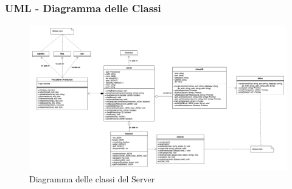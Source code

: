 \begin{landscape}
\subsubsection{UML - Diagramma delle Classi}
\begin{figure}[H]
	\begin{center}
		\includegraphics[scale=0.35]{./images/serverClassi.png} 
	\end{center}
	\caption{Diagramma delle classi del Server}
\end{figure}
\end{landscape}


